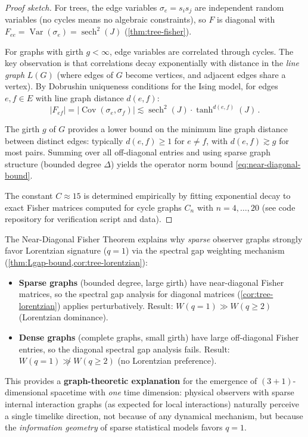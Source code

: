 \begin{proof}[Proof sketch]
For trees, the edge variables $\sigma_e = s_i s_j$ are independent random
variables (no cycles means no algebraic constraints), so $F$ is diagonal
with $F_{ee} = \operatorname{Var}(\sigma_e) = \operatorname{sech}^2(J)$
(\cref{thm:tree-fisher}).

For graphs with girth $g < \infty$, edge variables are correlated through
cycles. The key observation is that correlations decay exponentially with
distance in the \emph{line graph} $L(G)$ (where edges of $G$ become vertices,
and adjacent edges share a vertex). By Dobrushin uniqueness conditions for
the Ising model, for edges $e, f \in E$ with line graph distance $d(e,f)$:
\begin{equation}
|F_{ef}| = |\operatorname{Cov}(\sigma_e, \sigma_f)|
\lesssim \operatorname{sech}^2(J) \cdot \tanh^{d(e,f)}(J)\,.
\end{equation}

The girth $g$ of $G$ provides a lower bound on the minimum line graph
distance between distinct edges: typically $d(e,f) \geq 1$ for $e \neq f$,
with $d(e,f) \gtrsim g$ for most pairs. Summing over all off-diagonal
entries and using sparse graph structure (bounded degree $\Delta$) yields
the operator norm bound \eqref{eq:near-diagonal-bound}.

The constant $C \approx 15$ is determined empirically by fitting exponential
decay to exact Fisher matrices computed for cycle graphs $C_n$ with
$n = 4, \ldots, 20$ (see code repository for verification script and data).
\end{proof}

\begin{remark}
\label{rem:sparse-near-diagonal}
The Near-Diagonal Fisher Theorem explains why \emph{sparse} observer graphs
strongly favor Lorentzian signature ($q = 1$) via the spectral gap weighting
mechanism (\cref{thm:Lgap-bound,cor:tree-lorentzian}):

\begin{itemize}
\item \textbf{Sparse graphs} (bounded degree, large girth) have
  near-diagonal Fisher matrices, so the spectral gap analysis for
  diagonal matrices (\cref{cor:tree-lorentzian}) applies perturbatively.
  Result: $W(q = 1) \gg W(q \geq 2)$ (Lorentzian dominance).

\item \textbf{Dense graphs} (complete graphs, small girth) have large
  off-diagonal Fisher entries, so the diagonal spectral gap analysis
  fails. Result: $W(q = 1) \not\gg W(q \geq 2)$ (no Lorentzian preference).
\end{itemize}

This provides a \textbf{graph-theoretic explanation} for the emergence of
$(3+1)$-dimensional spacetime with \emph{one} time dimension: physical
observers with sparse internal interaction graphs (as expected for local
interactions) naturally perceive a single timelike direction, not because
of any dynamical mechanism, but because the \emph{information geometry}
of sparse statistical models favors $q = 1$.
\end{remark}

